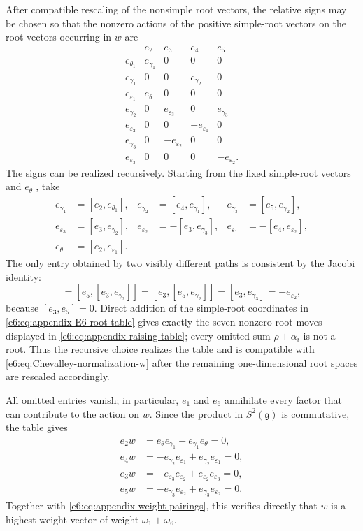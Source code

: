 \documentclass[11pt,reqno]{amsart}
\theoremstyle{definition}
\theoremstyle{remark}
\begin{document}
After compatible rescaling of the nonsimple root vectors, the relative signs may
be chosen so that the nonzero actions of the positive simple-root vectors on the
root vectors occurring in \(w\) are
\begin{equation}\label{e6:eq:appendix-raising-table}
\begin{array}{c|cccc}
 & e_2&e_3&e_4&e_5\\ \hline
 e_{\theta_1}     &e_{\gamma_1}&0&0&0\\
 e_{\gamma_1}     &0&0&e_{\gamma_2}&0\\
 e_{\varepsilon_1}&e_\theta&0&0&0\\
 e_{\gamma_2}     &0&e_{\varepsilon_3}&0&e_{\gamma_3}\\
 e_{\varepsilon_2}&0&0&-e_{\varepsilon_1}&0\\
 e_{\gamma_3}     &0&-e_{\varepsilon_2}&0&0\\
 e_{\varepsilon_3}&0&0&0&-e_{\varepsilon_2}.
\end{array}
\end{equation}
The signs can be realized recursively.  Starting from the fixed simple-root
vectors and $e_{\theta_1}$, take
\begin{align*}
 e_{\gamma_1}&=[e_2,e_{\theta_1}],
 &e_{\gamma_2}&=[e_4,e_{\gamma_1}],
 &e_{\gamma_3}&=[e_5,e_{\gamma_2}],\\
 e_{\varepsilon_3}&=[e_3,e_{\gamma_2}],
 &e_{\varepsilon_2}&=-[e_3,e_{\gamma_3}],
 &e_{\varepsilon_1}&=-[e_4,e_{\varepsilon_2}],\\
 e_\theta&=[e_2,e_{\varepsilon_1}].
\end{align*}
The only entry obtained by two visibly different paths is consistent by the
Jacobi identity:
\begin{equation*}
 [e_5,e_{\varepsilon_3}]
 =[e_5,[e_3,e_{\gamma_2}]]
 =[e_3,[e_5,e_{\gamma_2}]]
 =[e_3,e_{\gamma_3}]
 =-e_{\varepsilon_2},
\end{equation*}
because $[e_3,e_5]=0$.  Direct addition of the simple-root coordinates in
\eqref{e6:eq:appendix-E6-root-table} gives exactly the seven nonzero root
moves displayed in \eqref{e6:eq:appendix-raising-table}; every omitted sum
$\rho+\alpha_i$ is not a root.  Thus the recursive choice realizes the table
and is compatible with \eqref{e6:eq:Chevalley-normalization-w} after the
remaining one-dimensional root spaces are rescaled accordingly.

All omitted entries vanish; in particular, \(e_1\) and \(e_6\) annihilate every
factor that can contribute to the action on \(w\).  Since the product in
\(S^2(\mathfrak g)\) is commutative, the table gives
\begin{align*}
 e_2w
 &=e_\theta e_{\gamma_1}-e_{\gamma_1}e_\theta=0,\\
 e_4w
 &=-e_{\gamma_2}e_{\varepsilon_1}
   +e_{\gamma_2}e_{\varepsilon_1}=0,\\
 e_3w
 &=-e_{\varepsilon_3}e_{\varepsilon_2}
   +e_{\varepsilon_2}e_{\varepsilon_3}=0,\\
 e_5w
 &=-e_{\gamma_3}e_{\varepsilon_2}
   +e_{\gamma_3}e_{\varepsilon_2}=0.
\end{align*}
Together with \eqref{e6:eq:appendix-weight-pairings}, this verifies directly that
\(w\) is a highest-weight vector of weight \(\omega_1+\omega_6\).
\end{document}
